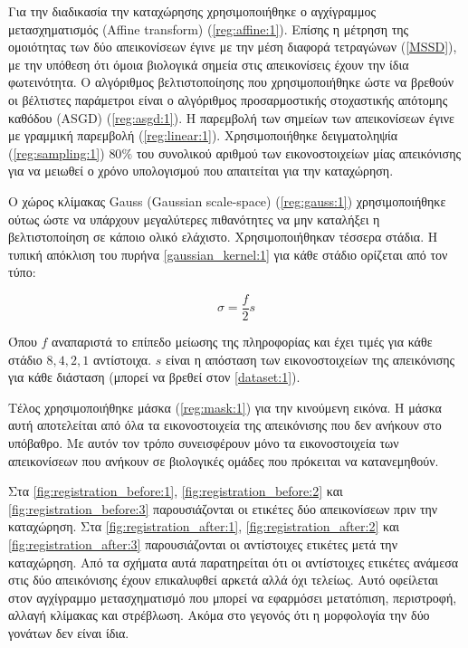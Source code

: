 \documentclass[a4paper,12pt]{article}
\begin{document}
Για την διαδικασία την καταχώρησης χρησιμοποιήθηκε ο αγχίγραμμος μετασχηματισμός
(Affine transform) (\ref{reg:affine:1}). Επίσης η μέτρηση της ομοιότητας των δύο
απεικονίσεων έγινε με την μέση διαφορά τετραγώνων (\ref{MSSD}), με την υπόθεση
ότι όμοια βιολογικά σημεία στις απεικονίσεις έχουν την ίδια φωτεινότητα. Ο
αλγόριθμος βελτιστοποίησης που χρησιμοποιήθηκε ώστε να βρεθούν οι βέλτιστες
παράμετροι είναι ο αλγόριθμος προσαρμοστικής στοχαστικής απότομης καθόδου
(ASGD) (\ref{reg:asgd:1}). Η παρεμβολή των σημείων των απεικονίσεων έγινε με
γραμμική παρεμβολή (\ref{reg:linear:1}).  Χρησιμοποιήθηκε δειγματοληψία
(\ref{reg:sampling:1}) $80\%$ του συνολικού αριθμού των εικονοστοιχείων μίας
απεικόνισης για να μειωθεί ο χρόνο υπολογισμού που απαιτείται για την
καταχώρηση.

Ο χώρος κλίμακας Gauss (Gaussian scale-space) (\ref{reg:gauss:1})
χρησιμοποιήθηκε ούτως ώστε να υπάρχουν μεγαλύτερες πιθανότητες να μην καταλήξει
η βελτιστοποίηση σε κάποιο ολικό ελάχιστο. Χρησιμοποιήθηκαν τέσσερα στάδια. Η
τυπική απόκλιση του πυρήνα \eqref{gaussian_kernel:1} για κάθε στάδιο ορίζεται
από τον τύπο:

\begin{equation} \label{standard_deviation:1}
    \sigma = \frac {f} {2} s
\end{equation}

Όπου $f$ αναπαριστά το επίπεδο μείωσης της πληροφορίας και έχει τιμές για κάθε
στάδιο $8,4,2,1$ αντίστοιχα. $s$ είναι η απόσταση των εικονοστοιχείων της
απεικόνισης για κάθε διάσταση (μπορεί να βρεθεί στον \autoref{dataset:1}).

Τέλος χρησιμοποιήθηκε μάσκα (\ref{reg:mask:1}) για την κινούμενη εικόνα. Η μάσκα
αυτή αποτελείται από όλα τα εικονοστοιχεία της απεικόνισης που δεν ανήκουν στο
υπόβαθρο. Με αυτόν τον τρόπο συνεισφέρουν μόνο τα εικονοστοιχεία των
απεικονίσεων που ανήκουν σε βιολογικές ομάδες που πρόκειται να κατανεμηθούν.

Στα \autoref{fig:registration_before:1}, \autoref{fig:registration_before:2} και
\autoref{fig:registration_before:3} παρουσιάζονται οι ετικέτες δύο απεικονίσεων
πριν την καταχώρηση. Στα \autoref{fig:registration_after:1},
\autoref{fig:registration_after:2} και \autoref{fig:registration_after:3}
παρουσιάζονται οι αντίστοιχες ετικέτες μετά την καταχώρηση. Από τα σχήματα αυτά
παρατηρείται ότι οι αντίστοιχες ετικέτες ανάμεσα στις δύο απεικόνισης έχουν
επικαλυφθεί αρκετά αλλά όχι τελείως. Αυτό οφείλεται στον αγχίγραμμο
μετασχηματισμό που μπορεί να εφαρμόσει μετατόπιση, περιστροφή, αλλαγή κλίμακας
και στρέβλωση. Ακόμα στο γεγονός ότι η μορφολογία την δύο γονάτων δεν είναι
ίδια.
\end{document}
